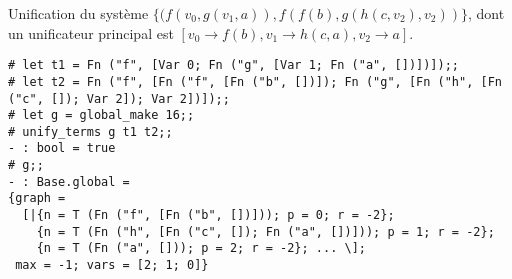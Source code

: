 \documentclass[9pt]{beamer}
\begin{document}
\begin{frame}[fragile]
  Unification du système $\{(f(v_0,g(v_1,a)),f(f(b),g(h(c,v_2),v_2))\}$, dont un unificateur principal est $[v_0\rightarrow f(b),v_1\rightarrow h(c,a),v_2\rightarrow a]$.\\

\begin{lstlisting}
# let t1 = Fn ("f", [Var 0; Fn ("g", [Var 1; Fn ("a", [])])]);;
# let t2 = Fn ("f", [Fn ("f", [Fn ("b", [])]); Fn ("g", [Fn ("h", [Fn ("c", []); Var 2]); Var 2])]);;
# let g = global_make 16;;
# unify_terms g t1 t2;;
- : bool = true
# g;;
- : Base.global =
{graph =
  [|{n = T (Fn ("f", [Fn ("b", [])])); p = 0; r = -2};
    {n = T (Fn ("h", [Fn ("c", []); Fn ("a", [])])); p = 1; r = -2};
    {n = T (Fn ("a", [])); p = 2; r = -2}; ... \];
 max = -1; vars = [2; 1; 0]}
\end{lstlisting}
\end{frame}
\end{document}
